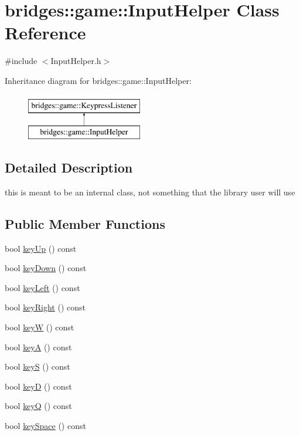 \hypertarget{classbridges_1_1game_1_1_input_helper}{}\section{bridges\+::game\+::Input\+Helper Class Reference}
\label{classbridges_1_1game_1_1_input_helper}


{\ttfamily \#include $<$Input\+Helper.\+h$>$}

Inheritance diagram for bridges\+::game\+::Input\+Helper\+:\begin{figure}[H]
\begin{center}
\leavevmode
\includegraphics[height=2.000000cm]{classbridges_1_1game_1_1_input_helper}
\end{center}
\end{figure}


\subsection{Detailed Description}
this is meant to be an internal class, not something that the library user will use \subsection*{Public Member Functions}
\begin{DoxyCompactItemize}
\item 
bool \mbox{\hyperlink{classbridges_1_1game_1_1_input_helper_aaa62faebd9e874228b710bb2a57cba2b}{key\+Up}} () const
\item 
bool \mbox{\hyperlink{classbridges_1_1game_1_1_input_helper_a904f5f5d2c6408bcd447044555cd376d}{key\+Down}} () const
\item 
bool \mbox{\hyperlink{classbridges_1_1game_1_1_input_helper_a9e98e137e69ef8b2f92e587092c42af4}{key\+Left}} () const
\item 
bool \mbox{\hyperlink{classbridges_1_1game_1_1_input_helper_a265fb9bd88d66e5439dd791bb90c79a4}{key\+Right}} () const
\item 
bool \mbox{\hyperlink{classbridges_1_1game_1_1_input_helper_a97a204c00019b28b4e95dde0b757a1aa}{keyW}} () const
\item 
bool \mbox{\hyperlink{classbridges_1_1game_1_1_input_helper_a168770e762b33e32597f9f7294082d9b}{keyA}} () const
\item 
bool \mbox{\hyperlink{classbridges_1_1game_1_1_input_helper_aa141b96b3406e66feab876185c7f350e}{keyS}} () const
\item 
bool \mbox{\hyperlink{classbridges_1_1game_1_1_input_helper_af7247d84254d706e3a309db2f4c20e9b}{keyD}} () const
\item 
bool \mbox{\hyperlink{classbridges_1_1game_1_1_input_helper_acef5fda1a5679e811fdf5a669dc65f9f}{keyQ}} () const
\item 
bool \mbox{\hyperlink{classbridges_1_1game_1_1_input_helper_a1750cd9c59e18126c251ec468fc87d48}{key\+Space}} () const
\end{DoxyCompactItemize}

